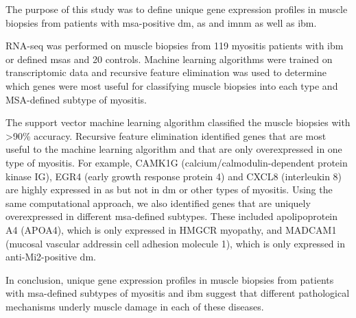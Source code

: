 The purpose of this study was to define unique gene expression profiles in muscle biopsies from patients with \gls{msa}-positive \gls{dm}, \gls{as} and \gls{imnm} as well as \gls{ibm}.

RNA-seq was performed on muscle biopsies from 119 myositis patients with \gls{ibm} or defined \gls{msa}s and 20 controls. Machine learning algorithms were trained on transcriptomic data and recursive feature elimination was used to determine which genes were most useful for classifying muscle biopsies into each type and MSA-defined subtype of myositis.

The support vector machine learning algorithm classified the muscle biopsies with >90\% accuracy. Recursive feature elimination identified genes that are most useful to the machine learning algorithm and that are only overexpressed in one type of myositis.
For example, CAMK1G (calcium/calmodulin-dependent protein kinase IG), EGR4 (early growth response protein 4) and CXCL8 (interleukin 8) are highly expressed in \gls{as} but not in \gls{dm} or other types of myositis. Using the same computational approach, we also identified genes that are uniquely overexpressed in different \gls{msa}-defined subtypes. These included apolipoprotein A4 (APOA4), which is only expressed in HMGCR myopathy, and MADCAM1 (mucosal vascular addressin cell adhesion molecule 1), which is only expressed in anti-Mi2-positive \gls{dm}.

In conclusion, unique gene expression profiles in muscle biopsies from patients with \gls{msa}-defined subtypes of myositis and \gls{ibm} suggest that different pathological mechanisms underly muscle damage in each of these diseases.

